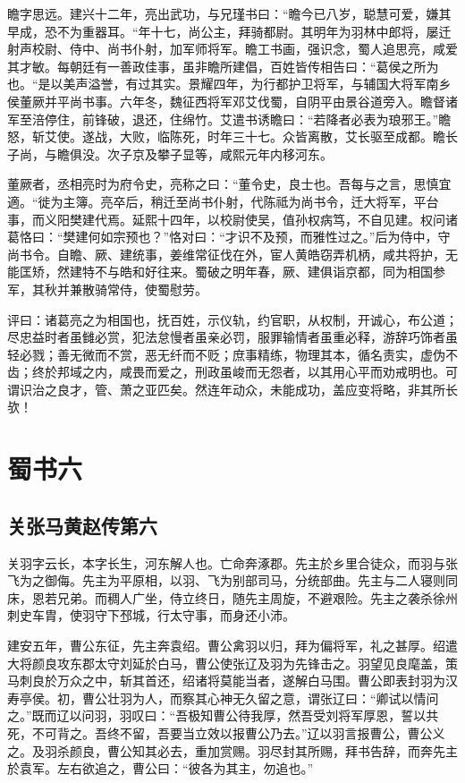 \documentclass[12pt,UTF8]{ctexbook}
\begin{document}
瞻字思远。建兴十二年，亮出武功，与兄瑾书曰：“瞻今已八岁，聪慧可爱，嫌其早成，恐不为重器耳。“年十七，尚公主，拜骑都尉。其明年为羽林中郎将，屡迁射声校尉、侍中、尚书仆射，加军师将军。瞻工书画，强识念，蜀人追思亮，咸爱其才敏。每朝廷有一善政佳事，虽非瞻所建倡，百姓皆传相告曰：“葛侯之所为也。“是以美声溢誉，有过其实。景耀四年，为行都护卫将军，与辅国大将军南乡侯董厥并平尚书事。六年冬，魏征西将军邓艾伐蜀，自阴平由景谷道旁入。瞻督诸军至涪停住，前锋破，退还，住绵竹。艾遣书诱瞻曰：“若降者必表为琅邪王。”瞻怒，斩艾使。遂战，大败，临陈死，时年三十七。众皆离散，艾长驱至成都。瞻长子尚，与瞻俱没。次子京及攀子显等，咸熙元年内移河东。

董厥者，丞相亮时为府令史，亮称之曰：“董令史，良士也。吾每与之言，思慎宜適。“徙为主簿。亮卒后，稍迁至尚书仆射，代陈祗为尚书令，迁大将军，平台事，而义阳樊建代焉。延熙十四年，以校尉使吴，值孙权病笃，不自见建。权问诸葛恪曰：“樊建何如宗预也？”恪对曰：“才识不及预，而雅性过之。”后为侍中，守尚书令。自瞻、厥、建统事，姜维常征伐在外，宦人黄皓窃弄机柄，咸共将护，无能匡矫，然建特不与皓和好往来。蜀破之明年春，厥、建俱诣京都，同为相国参军，其秋并兼散骑常侍，使蜀慰劳。

评曰：诸葛亮之为相国也，抚百姓，示仪轨，约官职，从权制，开诚心，布公道；尽忠益时者虽雠必赏，犯法怠慢者虽亲必罚，服罪输情者虽重必释，游辞巧饰者虽轻必戮；善无微而不赏，恶无纤而不贬；庶事精练，物理其本，循名责实，虚伪不齿；终於邦域之内，咸畏而爱之，刑政虽峻而无怨者，以其用心平而劝戒明也。可谓识治之良才，管、萧之亚匹矣。然连年动众，未能成功，盖应变将略，非其所长欤！

\part{蜀书六}
\chapter{关张马黄赵传第六}

关羽字云长，本字长生，河东解人也。亡命奔涿郡。先主於乡里合徒众，而羽与张飞为之御侮。先主为平原相，以羽、飞为别部司马，分统部曲。先主与二人寝则同床，恩若兄弟。而稠人广坐，侍立终日，随先主周旋，不避艰险。先主之袭杀徐州刺史车胄，使羽守下邳城，行太守事，而身还小沛。

建安五年，曹公东征，先主奔袁绍。曹公禽羽以归，拜为偏将军，礼之甚厚。绍遣大将颜良攻东郡太守刘延於白马，曹公使张辽及羽为先锋击之。羽望见良麾盖，策马刺良於万众之中，斩其首还，绍诸将莫能当者，遂解白马围。曹公即表封羽为汉寿亭侯。初，曹公壮羽为人，而察其心神无久留之意，谓张辽曰：“卿试以情问之。”既而辽以问羽，羽叹曰：“吾极知曹公待我厚，然吾受刘将军厚恩，誓以共死，不可背之。吾终不留，吾要当立效以报曹公乃去。”辽以羽言报曹公，曹公义之。及羽杀颜良，曹公知其必去，重加赏赐。羽尽封其所赐，拜书告辞，而奔先主於袁军。左右欲追之，曹公曰：“彼各为其主，勿追也。”
\end{document}
